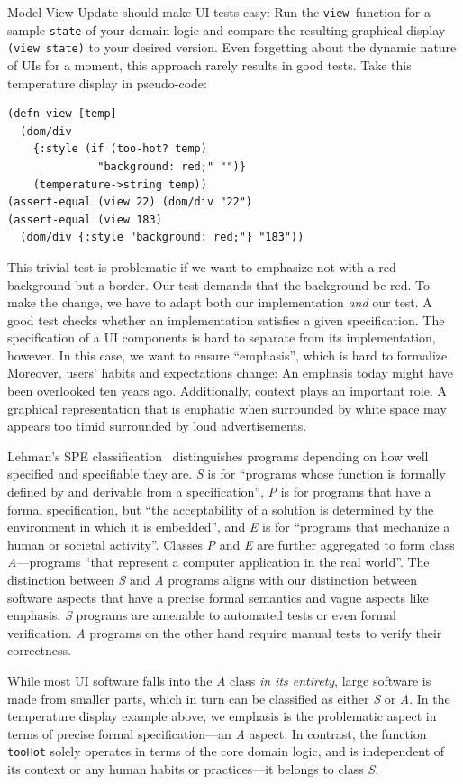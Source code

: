 \documentclass[sigplan,review,screen]{acmart}
\begin{document}
Model-View-Update should make UI tests easy: Run the
\texttt{view }function for a sample \texttt{state} of
your domain logic and compare the resulting graphical display
\texttt{(view state)} to your desired version. Even forgetting about
the dynamic nature of UIs for a moment, this approach rarely results
in good tests. Take this temperature display in pseudo-code:
%
\begin{verbatim}
(defn view [temp]
  (dom/div
    {:style (if (too-hot? temp)
              "background: red;" "")}
    (temperature->string temp))
(assert-equal (view 22) (dom/div "22")
(assert-equal (view 183)
  (dom/div {:style "background: red;"} "183"))
\end{verbatim}
%
This trivial test is problematic if we want to emphasize
not with a red background but a border.  Our test
demands that the background be red. To make the change,
we have to adapt both our implementation \textit{and} our
test.
A good
test checks whether an implementation satisfies a given specification.
The specification of a
UI components is hard to separate from its implementation,
however. In this case, we want to ensure ``emphasis'', which 
is hard to formalize. Moreover, users' habits and expectations
change: An emphasis today might have been overlooked ten years ago. Additionally,
context plays an important role. A graphical representation that is
emphatic when surrounded by white space may appears too timid
surrounded by loud advertisements.

Lehman's SPE classification~\cite{SPE} distinguishes programs
depending on how well specified and specifiable they are.
\textit{S} is for ``programs whose function is formally defined by and
derivable from a specification'', \textit{P} is for programs that have
a formal specification, but ``the acceptability of a solution is
determined by the environment in which it is embedded'', and
\textit{E} is for ``programs that mechanize a human or societal
activity''. Classes \textit{P} and \textit{E} are further aggregated
to form class \textit{A}---programs ``that represent a computer
application in the real world''. The distinction between \textit{S}
and \textit{A} programs aligns with our distinction between software
aspects that have a precise formal semantics and vague aspects like
emphasis. \textit{S} programs are amenable to automated tests
or even formal verification. \textit{A} programs on the other hand require manual tests to
verify their correctness.

While most UI software falls into the \textit{A} class \textit{in its
  entirety}, large software is made from smaller parts, which in turn
can be classified as either \textit{S} or \textit{A}. In the
temperature display example above, we
emphasis is the problematic aspect in terms of precise formal
specification---an \textit{A} aspect. In contrast, the function
\texttt{tooHot} solely operates in terms of the core domain
logic, and is independent of its context or any human habits
or practices---it belongs to class \textit{S}.
\end{document}
